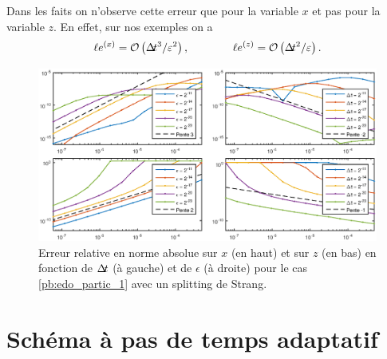 Dans les faits on n'observe cette erreur que pour la variable $x$ et pas pour la variable $z$. 
En effet, sur nos exemples on a 
$$ \ell e^{(x)} = \mathcal{O}\left( \Delta\!\!\!\ t^3/\varepsilon^2 \right) , \qquad \qquad 
\ell e^{(z)} = \mathcal{O}\left( \Delta\!\!\!\ t^2/\varepsilon \right) . $$
\begin{figure}[!h]
\centering
\includegraphics[width=\textwidth]{img/ann/conv_abs_strang_cas1.eps}
\caption{Erreur relative en norme absolue sur $x$ (en haut) et sur $z$ (en bas) en fonction de $\Delta\!\!\!\ t$ (à gauche) et de $\epsilon$ (à droite) pour le cas \eqref{pb:edo_partic_1} avec un splitting de Strang.}
\end{figure}

\section{Schéma à pas de temps adaptatif}
\label{subsec:ann_rke}

